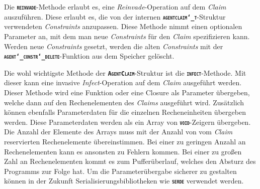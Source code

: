 Die \texttt{\textsc{\textbf{reinvade}}}-Methode erlaubt es, eine \textit{Reinvade}-Operation auf dem
\textit{Claim} auszuführen. Diese erlaubt es, die von der internen
\texttt{\textsc{\textbf{agentclaim\char`_t}}}-Struktur verwendeten \textit{Constraints} anzupassen.
Diese Methode nimmt einen optionalen Parameter an,
mit dem man neue \textit{Constraints} für den \textit{Claim} spezifizieren kann.
Werden neue \textit{Constraints} gesetzt, werden die alten \textit{Constraints} mit der
\texttt{\textsc{\textbf{agent\char`_constr\char`_delete}}}-Funktion aus dem Speicher gelöscht. 

Die wohl wichtigste Methode der \texttt{\textsc{\textbf{AgentClaim}}}-Struktur ist die
\texttt{\textsc{\textbf{infect}}}-Methode. Mit dieser kann eine invasive \textit{Infect}-Operation
auf dem \textit{Claim} ausgeführt werden.
Dieser Methode wird eine Funktion oder eine Closure als Parameter übergeben,
welche dann auf den Rechenelementen des \textit{Claims} ausgeführt wird.
Zusätzlich können ebenfalls Parameterdaten für die einzelnen Recheneinheiten übergeben werden.
Diese Parameterdaten werden als ein Array von \texttt{\textsc{\textbf{void}}}-Zeigern übergeben.
Die Anzahl der Elemente des Arrays muss mit der Anzahl von vom \textit{Claim} reservierten Rechenelemente 
übereinstimmen. Bei einer zu geringen Anzahl an Rechenelementen kann es ansonsten zu Fehlern kommen.
Bei einer zu großen Zahl an Rechenelementen kommt es zum Pufferüberlauf, welches den Absturz des Programms zur
Folge hat. Um die Parameterübergabe sicherer zu gestalten können in der Zukunft Serialisierungsbibliotheken
wie \texttt{\textsc{\textbf{serde}}} verwendet werden.

